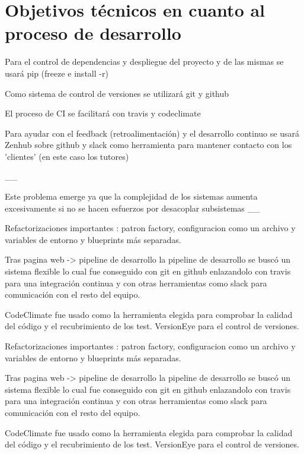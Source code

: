 \section{Objetivos técnicos en cuanto al proceso de desarrollo}
\begin{list}{-}{}
\item Para el control de dependencias y despliegue del proyecto y de las mismas se usará pip (freeze e install -r)
\item Como sistema de control de versiones se utilizará git y github
\item El proceso de CI se facilitará con travis y codeclimate
\item Para ayudar con el feedback (retroalimentación) y el desarrollo continuo se usará Zenhub sobre github y slack como herramienta para mantener contacto con los 'clientes' (en este caso los tutores)
\end{list}

__

 Este problema emerge ya que la complejidad de los sistemas aumenta excesivamente si no se hacen esfuerzos por desacoplar subsistemas
__


Refactorizaciones importantes : patron factory, configuracion como un archivo y variables de entorno y blueprints más separadas.



Tras pagina web -> pipeline de desarrollo
la pipeline de desarrollo se buscó un sistema flexible lo cual fue conseguido con git en github enlazandolo con travis para una integración continua y con otras herramientas como slack para comunicación con el resto del equipo.

CodeClimate fue usado como la herramienta elegida para comprobar la calidad del código y el recubrimiento de los test. VersionEye para el control de versiones.

Refactorizaciones importantes : patron factory, configuracion como un archivo y variables de entorno y blueprints más separadas.



Tras pagina web -> pipeline de desarrollo
la pipeline de desarrollo se buscó un sistema flexible lo cual fue conseguido con git en github enlazandolo con travis para una integración continua y con otras herramientas como slack para comunicación con el resto del equipo.

CodeClimate fue usado como la herramienta elegida para comprobar la calidad del código y el recubrimiento de los test. VersionEye para el control de versiones.
